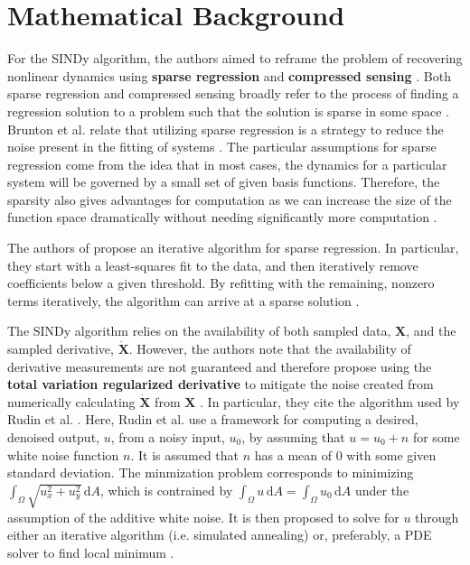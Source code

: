 \documentclass[10pt]{paper}
\begin{document}

\section{Mathematical Background} \label{sec:mathematical_background}
For the SINDy algorithm, the authors aimed to reframe the problem of recovering nonlinear dynamics using \textbf{sparse regression} and \textbf{compressed sensing} \cite{sindy}. Both sparse regression and compressed sensing broadly refer to the process of finding a regression solution to a problem such that the solution is sparse in some space \cite{sindy}. 
Brunton et al. relate that utilizing sparse regression is a strategy to reduce the noise present in the fitting of systems \cite{sindy}. The particular assumptions for sparse regression come from the idea that in most cases, the dynamics for a particular system will be governed by a small set of given basis functions. Therefore, the sparsity also gives advantages for computation as we can increase the size of the function space dramatically without needing significantly more computation \cite{sindy}. 

The authors of \cite{sindy} propose an iterative algorithm for sparse regression. In particular, they start with a least-squares fit to the data, and then iteratively remove coefficients below a given threshold. By refitting with the remaining, nonzero terms iteratively, the algorithm can arrive at a sparse solution \cite{sindy}. 

The SINDy algorithm relies on the availability of both sampled data, $\mathbf X$, and the sampled derivative, $\mathbf{\dot X}$. However, the authors note that the availability of derivative measurements are not guaranteed and therefore propose using the \textbf{total variation regularized derivative} to mitigate the noise created from numerically calculating $\mathbf {\dot X}$ from $\mathbf X$ \cite{sindy}. In particular, they cite the algorithm used by Rudin et al. \cite{rudin}. 
Here, Rudin et al. use a framework for computing a desired, denoised output, $u$, from a noisy input, $u_0$, by assuming that $u = u_0 + n$ for some white noise function $n$. It is assumed that $n$ has a mean of $0$ with some given standard deviation. 
The minmization problem corresponds to minimizing $\int_\Omega \sqrt{u_x^2 + u_y^2} \, \mathrm d A$, which is contrained by $\int_\Omega u \, \mathrm dA = \int_\Omega u_0 \, \mathrm dA$ under the assumption of the additive white noise. It is then proposed to solve for $u$ through either an iterative algorithm (i.e. simulated annealing) or, preferably, a PDE solver to find local minimum \cite{rudin}. 
\end{document}
